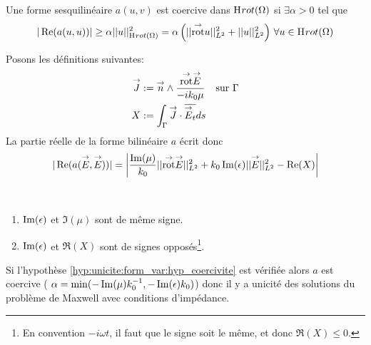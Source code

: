 			\begin{defn}[Coercivité]
				Une forme sesquilinéaire \(a(u,v)\) est coercive dans \(\mathrm{H}_\mathrm{{}}{rot}(\Omega)\) si \(\exists \alpha > 0\) tel que
				\[
					|\operatorname{Re}(a(u,u))| \ge \alpha ||u||_{\mathrm{H}_\mathrm{{}}{rot}(\Omega)}^2 = \alpha \left( || {{\overset{\rightarrow}{\operatorname{rot}}}} u ||_{L^2}^2 + || u ||_{L^2}^2\right) \, \forall u \in \mathrm{H}_\mathrm{{}}{rot}(\Omega)
				\]
			 \end{defn}


			Posons les définitions suivantes:
			\begin{align*}
				{\overset{\rightarrow}{J}} &:=  {\overset{\rightarrow}{n}} \wedge \dfrac{{{\overset{\rightarrow}{\operatorname{rot}}}} {\overset{\rightarrow}{E}}}{-ik_0\mu} && \text{sur \(\Gamma\)}
				\\X&:= \int_\Gamma {\overset{\rightarrow}{J}} \cdot {\overline{{\overset{\rightarrow}{E}}_t}} ds
			\end{align*}
			La partie réelle de la forme bilinéaire \(a\) écrit donc
			\begin{equation}
				\label{eq:unicite:form_var:decomp_form_bilin_1}
				|\operatorname{Re}(a({\overset{\rightarrow}{E}},{\overset{\rightarrow}{E}}))| = \left|\dfrac{\operatorname{Im}(\mu)}{k_0} || {{\overset{\rightarrow}{\operatorname{rot}}}} {\overset{\rightarrow}{E}} ||_{L^2}^2  + k_0 \operatorname{Im}(\epsilon) || {\overset{\rightarrow}{E}} ||_{L^2}^2
				- \operatorname{Re}(X)\right|
			\end{equation}

			\begin{hyp}\label{hyp:unicite:form_var:hyp_coercivite}
				~{}

				\begin{enumerate}
					\item \(\operatorname{Im}(\epsilon)\) et \(\Im(\mu)\) sont de même signe.
					\item \(\operatorname{Im}(\epsilon)\) et \(\Re(X)\) sont de signes opposés\footnote{En convention \(-i\omega t\), il faut que le signe soit le même, et donc \(\Re(X) \le 0\).}.
				\end{enumerate}
			\end{hyp}

			Si l'hypothèse \ref{hyp:unicite:form_var:hyp_coercivite} est vérifiée alors \(a\) est coercive ( \(\alpha = \min(-\operatorname{Im}(\mu)k_0^{-1},-\operatorname{Im}(\epsilon)k_0)\)) donc il y a unicité des solutions du problème de Maxwell avec conditions d'impédance.

